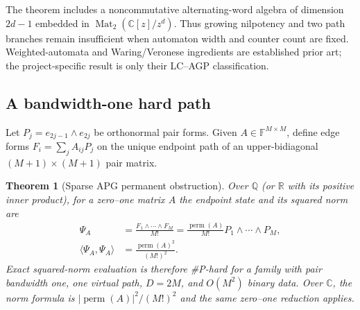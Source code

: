 \documentclass[aps,pra,reprint,superscriptaddress,nofootinbib,longbibliography,showkeys]{revtex4-2}
\newtheorem{theorem}{Theorem}[section]
\theoremstyle{definition}
\newcommand{\Mat}{\operatorname{Mat}}
\newcommand{\perm}{\operatorname{perm}}
\begin{document}
The theorem includes a noncommutative alternating-word algebra of dimension
$2d-1$ embedded in $\Mat_2(\mathbb C[z]/z^d)$.  Thus growing nilpotency and two
path branches remain insufficient when automaton width and counter count are
fixed.  Weighted-automata and Waring/Veronese ingredients are established
prior art; the project-specific result is only their LC--AGP classification.

\subsection{A bandwidth-one hard path}

Let $P_j=e_{2j-1}\wedge e_{2j}$ be orthonormal pair forms.  Given
$A\in\mathbb F^{M\times M}$, define edge forms
$F_i=\sum_jA_{ij}P_j$ on the unique endpoint path of an upper-bidiagonal
$(M+1)\times(M+1)$ pair matrix.

\begin{theorem}[Sparse APG permanent obstruction]
Over $\mathbb Q$ (or $\mathbb R$ with its positive inner product), for a
zero--one matrix $A$ the endpoint state and its squared norm are
\begin{align}
 \Psi_A&=\frac{F_1\wedge\cdots\wedge F_M}{M!}
 =\frac{\perm(A)}{M!}P_1\wedge\cdots\wedge P_M,
 \nonumber\\
 \langle\Psi_A,\Psi_A\rangle&=\frac{\perm(A)^2}{(M!)^2}.
\end{align}
Exact squared-norm evaluation is therefore \#P-hard for a family with pair
bandwidth one, one virtual path, $D=2M$, and $O(M^2)$ binary data.  Over
$\mathbb C$, the norm formula is $|\perm(A)|^2/(M!)^2$ and the same zero--one
reduction applies.
\end{theorem}
\end{document}
